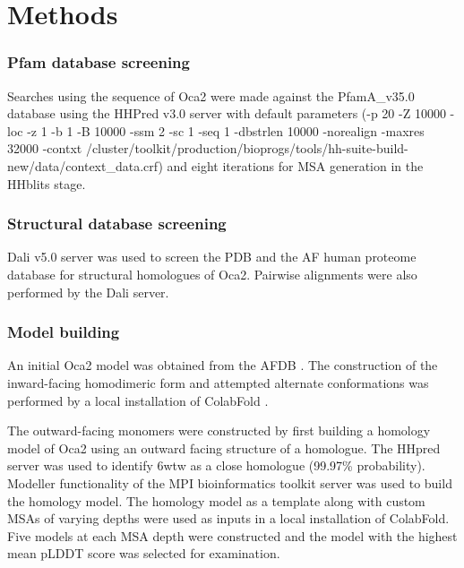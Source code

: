 \section{Methods}



\subsubsection{Pfam database screening}
Searches using the sequence of Oca2 were made against the Pfam\-A\_v35.0 \cite{El-Gebali2019} database using the HHPred v3.0 server \cite{Zimmermann2018} with default parameters (-p 20 -Z 10000 -loc -z 1 -b 1 -B 10000 -ssm 2 -sc 1 -seq 1 -dbstrlen 10000 -norealign -maxres 32000 -contxt /cluster/toolkit/production/bioprogs/tools/hh-suite-build-new/data/context\_data.crf) and eight iterations for MSA generation in the HHblits \cite{Zimmermann2018} stage.

\subsubsection{Structural database screening}
Dali v5.0 server \cite{Holm2016} was used to screen the PDB \cite{Burley2018} and the AF human proteome database \cite{david2022alphafold} for structural homologues of Oca2.  Pairwise alignments were also performed by the Dali server.

\subsubsection{Model building}
An initial Oca2 model was obtained from the AFDB \cite{david2022alphafold}.   The construction of the inward-facing homodimeric form and attempted alternate conformations was performed by a local installation of ColabFold \cite{mirdita2021colabfold}.  

The outward-facing monomers were constructed by first building a homology model of Oca2 using an outward facing structure of a homologue.  The HHpred server was used to identify 6wtw as a close homologue (99.97\% probability).  Modeller \cite{eswar2006comparative} functionality of the MPI bioinformatics toolkit server was used to build the homology model. The homology model as a template along with custom MSAs of varying depths were used as inputs in a local installation of ColabFold. Five models at each MSA depth were constructed and the model with the highest mean pLDDT score was selected for examination.


